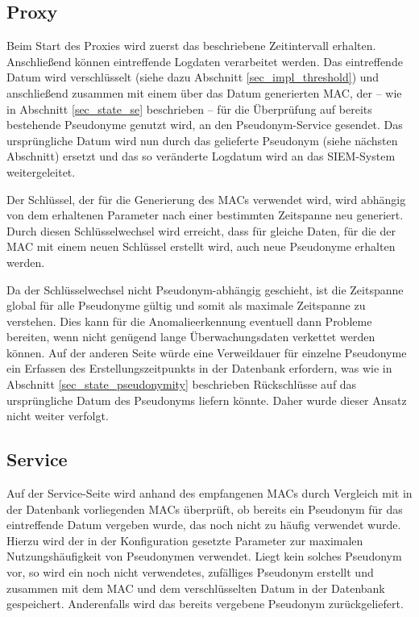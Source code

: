 \subsection{Proxy}

Beim Start des Proxies wird zuerst das beschriebene Zeitintervall erhalten. Anschließend können eintreffende Logdaten verarbeitet werden. Das eintreffende Datum wird verschlüsselt (siehe dazu Abschnitt \ref{sec_impl_threshold}) und anschließend zusammen mit einem über das Datum generierten MAC, der -- wie in Abschnitt \ref{sec_state_se} beschrieben -- für die Überprüfung auf bereits bestehende Pseudonyme genutzt wird, an den Pseudonym-Service gesendet. Das ursprüngliche Datum wird nun durch das gelieferte Pseudonym (siehe nächsten Abschnitt) ersetzt und das so veränderte Logdatum wird an das SIEM-System weitergeleitet.

Der Schlüssel, der für die Generierung des MACs verwendet wird, wird abhängig von dem erhaltenen Parameter nach einer bestimmten Zeitspanne neu generiert. Durch diesen Schlüsselwechsel wird erreicht, dass für gleiche Daten, für die der MAC mit einem neuen Schlüssel erstellt wird, auch neue Pseudonyme erhalten werden. 

Da der Schlüsselwechsel nicht Pseudonym-abhängig geschieht, ist die Zeitspanne global für alle Pseudonyme gültig und somit als maximale Zeitspanne zu verstehen. Dies kann für die Anomalieerkennung eventuell dann Probleme bereiten, wenn nicht genügend lange Überwachungsdaten verkettet werden können. Auf der anderen Seite würde eine Verweildauer für einzelne Pseudonyme ein Erfassen des Erstellungszeitpunkts in der Datenbank erfordern, was wie in Abschnitt \ref{sec_state_pseudonymity} beschrieben Rückschlüsse auf das ursprüngliche Datum des Pseudonyms liefern könnte. Daher wurde dieser Ansatz nicht weiter verfolgt.

\subsection{Service}

Auf der Service-Seite wird anhand des empfangenen MACs durch Vergleich mit in der Datenbank vorliegenden MACs überprüft, ob bereits ein Pseudonym für das eintreffende Datum vergeben wurde, das noch nicht zu häufig verwendet wurde. Hierzu wird der in der Konfiguration gesetzte Parameter zur maximalen Nutzungshäufigkeit von Pseudonymen verwendet. Liegt kein solches Pseudonym vor, so wird ein noch nicht verwendetes, zufälliges Pseudonym erstellt und zusammen mit dem MAC und dem verschlüsselten Datum in der Datenbank gespeichert. Anderenfalls wird das bereits vergebene Pseudonym zurückgeliefert. 

